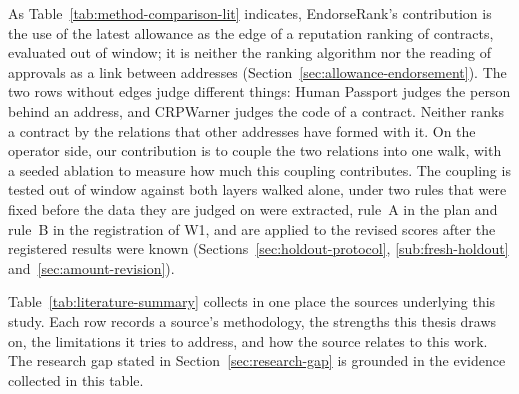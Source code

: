 As Table~\ref{tab:method-comparison-lit} indicates, EndorseRank's contribution is the use of the latest allowance as the edge of a reputation ranking of contracts, evaluated out of window; it is neither the ranking algorithm nor the reading of approvals as a link between addresses (Section~\ref{sec:allowance-endorsement}). The two rows without edges judge different things: Human Passport judges the person behind an address, and CRPWarner judges the code of a contract. Neither ranks a contract by the relations that other addresses have formed with it. On the operator side, our contribution is to couple the two relations into one walk, with a seeded ablation to measure how much this coupling contributes. The coupling is tested out of window against both layers walked alone, under two rules that were fixed before the data they are judged on were extracted, rule~A in the plan and rule~B in the registration of W1, and are applied to the revised scores after the registered results were known (Sections~\ref{sec:holdout-protocol}, \ref{sub:fresh-holdout} and~\ref{sec:amount-revision}).


Table~\ref{tab:literature-summary} collects in one place the sources underlying this study. Each row records a source's methodology, the strengths this thesis draws on, the limitations it tries to address, and how the source relates to this work. The research gap stated in Section~\ref{sec:research-gap} is grounded in the evidence collected in this table.

